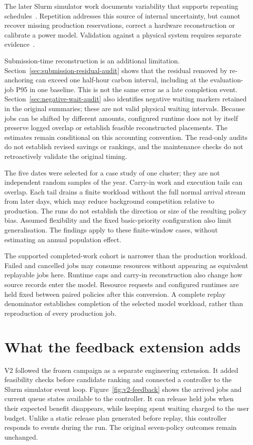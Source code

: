 The later Slurm simulator work documents variability that supports repeating schedules~\cite{simakov2022accurate}. Repetition addresses this source of internal uncertainty, but cannot recover missing production reservations, correct a hardware reconstruction or calibrate a power model. Validation against a physical system requires separate evidence~\cite{jokanovic2018validation}.

Submission-time reconstruction is an additional limitation. Section~\ref{sec:submission-residual-audit} shows that the residual removed by re-anchoring can exceed one half-hour carbon interval, including at the evaluation-job P95 in one baseline. This is not the same error as a late completion event. Section~\ref{sec:negative-wait-audit} also identifies negative waiting markers retained in the original summaries; these are not valid physical waiting intervals. Because jobs can be shifted by different amounts, configured runtime does not by itself preserve logged overlap or establish feasible reconstructed placements. The estimates remain conditional on this accounting convention. The read-only audits do not establish revised savings or rankings, and the maintenance checks do not retroactively validate the original timing.

The five dates were selected for a case study of one cluster; they are not independent random samples of the year. Carry-in work and execution tails can overlap. Each tail drains a finite workload without the full normal arrival stream from later days, which may reduce background competition relative to production. The runs do not establish the direction or size of the resulting policy bias. Assumed flexibility and the fixed basic-priority configuration also limit generalisation. The findings apply to these finite-window cases, without estimating an annual population effect.

The supported completed-work cohort is narrower than the production workload. Failed and cancelled jobs may consume resources without appearing as equivalent replayable jobs here. Runtime caps and carry-in reconstruction also change how source records enter the model. Resource requests and configured runtimes are held fixed between paired policies after this conversion. A complete replay denominator establishes completion of the selected model workload, rather than reproduction of every production job.

\section{What the feedback extension adds}
V2 followed the frozen campaign as a separate engineering extension. It added feasibility checks before candidate ranking and connected a controller to the Slurm simulator event loop. Figure~\ref{fig:v2-feedback} shows the arrived jobs and current queue states available to the controller. It can release held jobs when their expected benefit disappears, while keeping spent waiting charged to the user budget. Unlike a static release plan generated before replay, this controller responds to events during the run. The original seven-policy outcomes remain unchanged.

